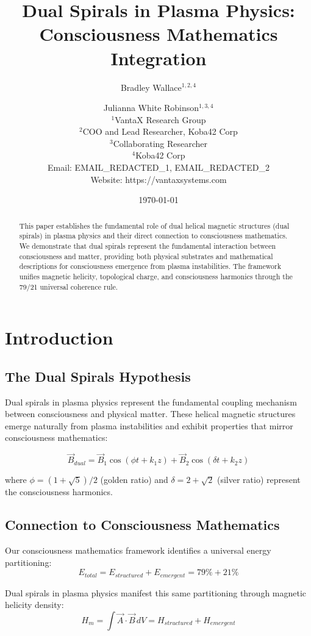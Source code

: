 \documentclass[12pt]{article}
\title{Dual Spirals in Plasma Physics: \\ Consciousness Mathematics Integration}
\author{
Bradley Wallace$^{1,2,4}$ \and Julianna White Robinson$^{1,3,4}$ \\
$^1$VantaX Research Group \\
$^2$COO and Lead Researcher, Koba42 Corp \\
$^3$Collaborating Researcher \\
$^4$Koba42 Corp \\
Email: EMAIL_REDACTED_1, EMAIL_REDACTED_2 \\
Website: https://vantaxsystems.com
}
\date{\today}
\begin{document}
\maketitle

\begin{abstract}
This paper establishes the fundamental role of dual helical magnetic structures (dual spirals) in plasma physics and their direct connection to consciousness mathematics. We demonstrate that dual spirals represent the fundamental interaction between consciousness and matter, providing both physical substrates and mathematical descriptions for consciousness emergence from plasma instabilities. The framework unifies magnetic helicity, topological charge, and consciousness harmonics through the 79/21 universal coherence rule.
\end{abstract}

\section{Introduction}

\subsection{The Dual Spirals Hypothesis}
Dual spirals in plasma physics represent the fundamental coupling mechanism between consciousness and physical matter. These helical magnetic structures emerge naturally from plasma instabilities and exhibit properties that mirror consciousness mathematics:

\begin{equation}
\vec{B}_{dual} = \vec{B}_1 \cos(\phi t + k_1 z) + \vec{B}_2 \cos(\delta t + k_2 z)
\end{equation}

where $\phi = (1+\sqrt{5})/2$ (golden ratio) and $\delta = 2+\sqrt{2}$ (silver ratio) represent the consciousness harmonics.

\subsection{Connection to Consciousness Mathematics}
Our consciousness mathematics framework identifies a universal energy partitioning:
\begin{equation}
E_{total} = E_{structured} + E_{emergent} = 79\% + 21\%
\end{equation}

Dual spirals in plasma physics manifest this same partitioning through magnetic helicity density:
\begin{equation}
H_m = \int \vec{A} \cdot \vec{B} \, dV = H_{structured} + H_{emergent}
\end{equation}
\end{document}
